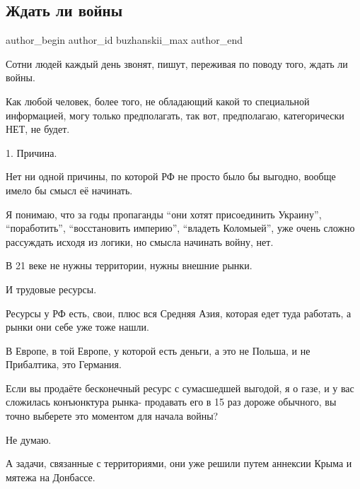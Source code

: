  
 
 
 
 
 
\subsection{Ждать ли войны}
\label{sec:25_01_2022.fb.buzhanskii_max.1.zhdat_li_vojny}
 
\ifcmt
 author_begin
   author_id buzhanskii_max
 author_end
\fi

Сотни людей каждый день звонят, пишут, переживая по поводу того, ждать ли
войны.

Как любой человек, более того, не обладающий какой то специальной информацией,
могу только предполагать, так вот, предполагаю, категорически НЕТ, не будет.

1.  Причина.

Нет ни одной причины, по которой РФ не просто было бы выгодно, вообще имело бы
смысл её начинать.

Я понимаю, что за годы пропаганды \enquote{они хотят присоединить Украину},
\enquote{поработить}, \enquote{восстановить империю}, \enquote{владеть Коломыей}, уже очень сложно
рассуждать исходя из логики, но смысла начинать войну, нет.

В 21 веке не нужны территории, нужны внешние рынки.

И трудовые ресурсы.

Ресурсы у РФ есть, свои, плюс вся Средняя Азия, которая едет туда работать, а
рынки они себе уже тоже нашли.

В Европе, в той Европе, у которой есть деньги, а это не Польша, и не
Прибалтика, это Германия.

Если вы продаёте бесконечный ресурс с сумасшедшей выгодой, я о газе, и у вас
сложилась конъюнктура рынка- продавать его в 15 раз дороже обычного, вы точно
выберете это моментом для начала войны?

Не думаю.

А задачи, связанные с территориями, они уже решили путем аннексии Крыма и
мятежа на Донбассе.

